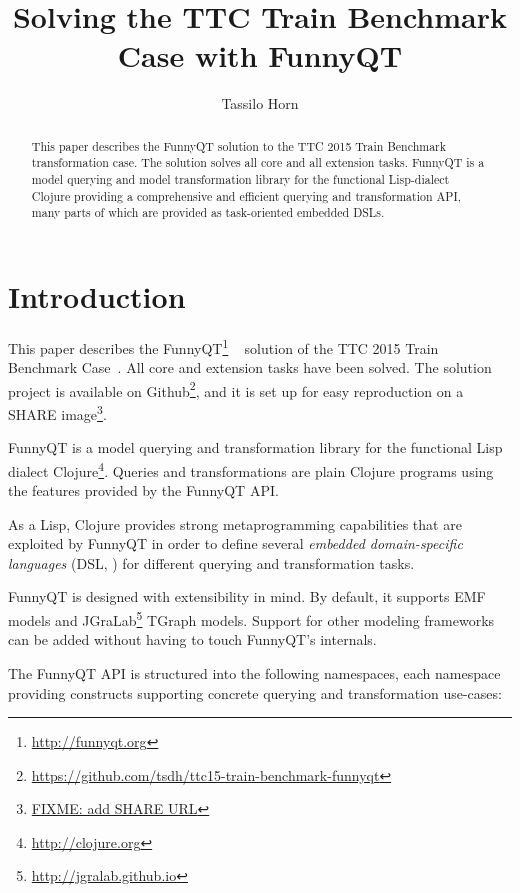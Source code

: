 \documentclass[submission]{eptcs}
\title{Solving the TTC Train Benchmark Case with FunnyQT}
\author{Tassilo Horn
  \institute{Institute for Software Technology, University Koblenz-Landau, Germany}
  \email{horn@uni-koblenz.de}}
\begin{document}
\maketitle

\begin{abstract}
  This paper describes the FunnyQT solution to the TTC 2015 Train Benchmark
  transformation case.  The solution solves all core and all extension tasks.
  FunnyQT is a model querying and model transformation library for the
  functional Lisp-dialect Clojure providing a comprehensive and efficient
  querying and transformation API, many parts of which are provided as
  task-oriented embedded DSLs.
\end{abstract}


\section{Introduction}
\label{sec:introduction}

This paper describes the FunnyQT\footnote{\url{http://funnyqt.org}}
~\cite{Horn2013MQWFQ} solution of the TTC 2015 Train Benchmark
Case~\cite{train-benchmark-case-desc}.  All core and extension tasks have been
solved.  The solution project is available on
Github\footnote{\url{https://github.com/tsdh/ttc15-train-benchmark-funnyqt}},
and it is set up for easy reproduction on a SHARE image\footnote{\url{FIXME:
    add SHARE URL}}.

FunnyQT is a model querying and transformation library for the functional Lisp
dialect Clojure\footnote{\url{http://clojure.org}}.  Queries and
transformations are plain Clojure programs using the features provided by the
FunnyQT API.

As a Lisp, Clojure provides strong metaprogramming capabilities that are
exploited by FunnyQT in order to define several \emph{embedded domain-specific
  languages} (DSL, \cite{book:Fowler2010DSL}) for different querying and
transformation tasks.

FunnyQT is designed with extensibility in mind.  By default, it supports EMF
\cite{Steinberg2008EEM} models and
JGraLab\footnote{\url{http://jgralab.github.io}} TGraph models.  Support for
other modeling frameworks can be added without having to touch FunnyQT's
internals.

The FunnyQT API is structured into the following namespaces, each namespace
providing constructs supporting concrete querying and transformation use-cases:
\end{document}
